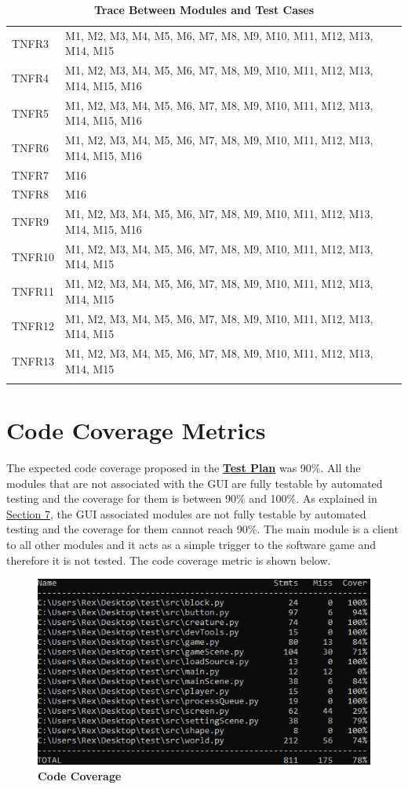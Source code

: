 \documentclass[12pt, titlepage]{article}
\begin{document}
\begin{longtable}{p{} p{}}
TNFR3 & M1, M2, M3, M4, M5, M6, M7, M8, M9, M10, M11, M12, M13, M14, M15\\
TNFR4 & M1, M2, M3, M4, M5, M6, M7, M8, M9, M10, M11, M12, M13, M14, M15, M16\\
TNFR5 & M1, M2, M3, M4, M5, M6, M7, M8, M9, M10, M11, M12, M13, M14, M15, M16\\
TNFR6 & M1, M2, M3, M4, M5, M6, M7, M8, M9, M10, M11, M12, M13, M14, M15, M16\\
TNFR7 & M16\\
TNFR8 & M16\\
TNFR9 & M1, M2, M3, M4, M5, M6, M7, M8, M9, M10, M11, M12, M13, M14, M15, M16\\
TNFR10 & M1, M2, M3, M4, M5, M6, M7, M8, M9, M10, M11, M12, M13, M14, M15\\
TNFR11 & M1, M2, M3, M4, M5, M6, M7, M8, M9, M10, M11, M12, M13, M14, M15\\
TNFR12 & M1, M2, M3, M4, M5, M6, M7, M8, M9, M10, M11, M12, M13, M14, M15\\
TNFR13 & M1, M2, M3, M4, M5, M6, M7, M8, M9, M10, M11, M12, M13, M14, M15\\
\bottomrule
\caption{\bf Trace Between Modules and Test Cases}
\label{TblRT}
\end{longtable}

\section{Code Coverage Metrics}
The expected code coverage proposed in the \href{https://gitlab.cas.mcmaster.ca/wangs132/minecraft/-/blob/master/Doc/TestPlan/TestPlan.pdf}{\bf Test Plan} was 90\%. All the modules that are not associated with the GUI are fully testable by automated testing and the coverage for them is between 90\% and 100\%. As explained in \hyperref[auto]{Section 7}, the GUI associated modules are not fully testable by automated testing and the coverage for them cannot reach 90\%. The main module is a client to all other modules and it acts as a simple trigger to the software game and therefore it is not tested. The code coverage metric is shown below.
\FloatBarrier
\begin{figure}[!htbp]
    \centering
    \includegraphics[scale=0.75]{coverage}
    \caption{\textbf{Code Coverage}}
\end{figure}
\FloatBarrier
\end{document}

